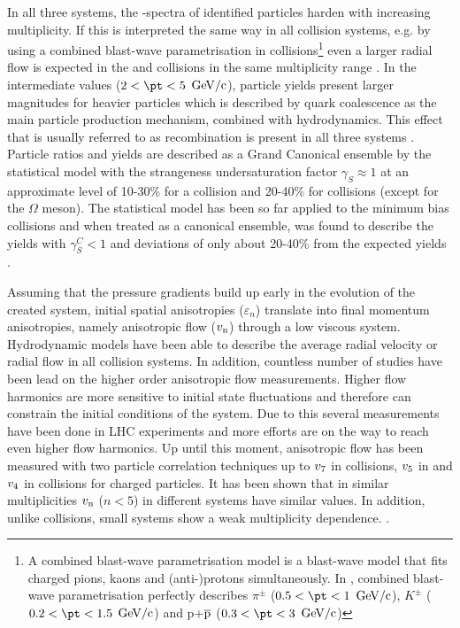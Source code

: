 \documentclass[../report.tex]{subfiles}
\begin{document}
In all three systems, the \pt-spectra of identified particles harden with increasing multiplicity. If this is interpreted the same way in all collision systems, e.g. by using a combined blast-wave parametrisation in \PbPb collisions\footnote{A combined blast-wave parametrisation model is a blast-wave model that fits charged pions, kaons and (anti-)protons simultaneously. In \cite{Abelev:2012wca}, combined blast-wave parametrisation perfectly describes $\pi^{\pm}$ ($ 0.5 < \pt < 1$ $\rm{GeV}/c$), $K^{\pm}$ ($ 0.2 < \pt < 1.5$ $\rm{GeV}/c$) and p+$\overline{\rm{p}}$ ($ 0.3 < \pt < 3$ $\rm{GeV}/c$)} even a larger radial flow is expected in the \pp{} and \pPb{} collisions in the same multiplicity range \cite{Shuryak:2013ke}. In the intermediate \pt{} values ($2 < \pt < 5 $ $\rm{GeV}/c$), particle yields present larger magnitudes for heavier particles which is described by quark coalescence as the main particle production mechanism, combined with hydrodynamics. This effect that is usually referred to as recombination is present in all three systems \cite{Andrei:2014vaa,Abelev:2013xaa,Abelev:2013haa,Abelev:2014uua,Khachatryan:2016yru,Adam:2015jca,Adam:2016dau,Adam:2017zbf}. Particle ratios and yields are described as a Grand Canonical ensemble by the statistical model with the strangeness undersaturation factor $\gamma_{S}\approx 1$ at an approximate level of 10-30\% for a \PbPb{} collision and 20-40\% for \pPb{} collisions (except for the $\Omega$ meson). The statistical model has been so far applied to the minimum bias \pp{} collisions and when treated as a canonical ensemble, was found to describe the yields with $\gamma^{C}_{S} < 1$ and deviations of only about 20-40\% from the expected yields \cite{Adam:2016emw,Adam:2016bpr,Adam:2015vsf,ABELEV:2013zaa}. 

Assuming that the pressure gradients build up early in the evolution of the created system, initial spatial anisotropies ($\varepsilon_n$) translate into final momentum anisotropies, namely anisotropic flow ($v_{\rm{n}}$) through a low viscous system. Hydrodynamic models have been able to describe the average radial velocity or radial flow in all collision systems. In addition, countless number of studies have been lead on the higher order anisotropic flow measurements. Higher flow harmonics are more sensitive to initial state fluctuations and therefore can constrain the initial conditions of the system. Due to this several measurements have been done in LHC experiments and more efforts are on the way to reach even higher flow harmonics. Up until this moment, anisotropic flow has been measured with two particle correlation techniques up to $v_{\rm{7}}$ in \PbPb collisions, $v_{\rm{5}}$ in \pPb and $v_{\rm{4}}$ in \pp collisions for charged particles. It has been shown that in similar multiplicities $v_{\rm{n}}$ ($n<5$) in different systems have similar values. In addition, unlike \PbPb collisions, small systems show a weak multiplicity dependence. \cite{CMS:2012qk,Abelev:2012ola,Aad:2012gla,Aamodt:2011by,Chatrchyan:2011eka,Chatrchyan:2012wg,ATLAS:2012at,Aad:2014lta,Aad:2015gqa,CMS:2015zpa,Khachatryan:2016txc,Acharya:2017ino,Adam:2016ows,Adam:2016nfo,Acharya:2018zuq,Sirunyan:2017uyl,Aaboud:2017acw}.
\end{document}
